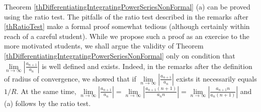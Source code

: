 \documentclass[12pt]{book}
\begin{document}
Theorem \ref{thDifferentiatingIntegratingPowerSeriesNonFormal} (a) can be proved using the ratio test. The pitfalls of the ratio test described in the remarks after \ref{thRatioTest} make a formal proof somewhat tedious (although certainly within reach of a careful student). While we propose such a proof as an exercise to the more motivated students, we shall argue the validity of  Theorem \ref{thDifferentiatingIntegratingPowerSeriesNonFormal} only on condition that $\lim\limits_{n\to\infty} \left|\frac{a_{n+1}}{a_n}\right|$ is well defined and exists. Indeed, in the remarks after the definition of radius of convergence, we showed that if $\lim\limits_{n\to\infty} \left|\frac{a_{n+1}}{a_n}\right|$ exists it necessarily equals $1/R$. At the same time, $\lim\limits_{n\to\infty} \left|\frac{a_{n+1}}{a_n}\right| = \lim\limits_{n\to\infty} \left|\frac{a_{n+1}(n+1)}{a_n n}\right|= \lim\limits_{n\to\infty} \left|\frac{a_{n+1}n}{a_n (n+1)}\right|$ and (a) follows by the ratio test.
\end{document}
